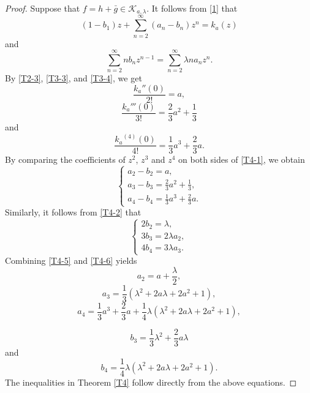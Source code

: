 \documentclass[10pt,a4paper]{amsart}
\begin{document}
\begin{proof} Suppose that $f=h+\bar{g}\in\mathcal{K}_{a,\lambda}$.
	It follows from \eqref{1} that
    \begin{equation}\label{T4-1}
        \left(1-b_1\right)z+\sum\limits_{n=2}^{\infty}(a_n-b_n)z^n=k_a(z)
    \end{equation}
    and
    \begin{equation}\label{T4-2}
        \sum\limits_{n=2}^{\infty}nb_nz^{n-1}=\sum\limits_{n=2}^{\infty}\lambda na_nz^n.
    \end{equation}
	By \eqref{T2-3}, \eqref{T3-3}, and \eqref{T3-4}, we get %
    $$\dfrac{k_a''(0)}{2!}=a,$$ 
    \begin{equation*}\label{T4-3}
        \dfrac{k_a'''(0)}{3!}=\dfrac{2}{3}a^2+\dfrac{1}{3}
    \end{equation*}
    and 
     \begin{equation*}\label{T4-4}
        \dfrac{{k_a}^{(4)}(0)}{4!}=\dfrac{1}{3}a^3+\dfrac{2}{3}a.
    \end{equation*}
	By comparing the coefficients of $z^2$, $z^3$ and $z^4$ on both sides of \eqref{T4-1}, we obtain
	\begin{equation}\label{T4-5}
		\begin{cases}
			a_2-b_2=a,\\
			a_3-b_3=\frac{2}{3}a^2+\frac{1}{3},\\
			a_4-b_4=\frac{1}{3}a^3+\frac{2}{3}a.
		\end{cases}
	\end{equation}
	Similarly, it follows from \eqref{T4-2} that
	\begin{equation}\label{T4-6}
		\begin{cases}
			2b_2=\lambda,\\
			3b_3=2\lambda a_2,\\
			4b_4=3\lambda a_3.
		\end{cases}
	\end{equation}
   Combining \eqref{T4-5} and \eqref{T4-6} yields
    \begin{equation*}\label{T4-7}
        a_2=a+\dfrac{\lambda}{2},
    \end{equation*}
     \begin{equation*}\label{T4-8}
        a_3=\dfrac{1}{3}\left(\lambda^2+2a\lambda+2a^2+1\right),
    \end{equation*}
     \begin{equation*}\label{T4-9}
        a_4=\dfrac{1}{3}a^3+\dfrac{2}{3}a+
        \dfrac{1}{4}\lambda\left(\lambda^2+2a\lambda+2a^2+1\right),
    \end{equation*}
  
     \begin{equation*}\label{T4-10}
        b_3=\dfrac{1}{3}\lambda^2+\dfrac{2}{3}a\lambda
    \end{equation*}  and 
     \begin{equation*}\label{T4-11}
        b_4=\dfrac{1}{4}\lambda\left(\lambda^2+2a\lambda+2a^2+1\right).
    \end{equation*}
The inequalities in Theorem \ref{T4} follow directly from the above equations.
\end{proof}
\end{document}
